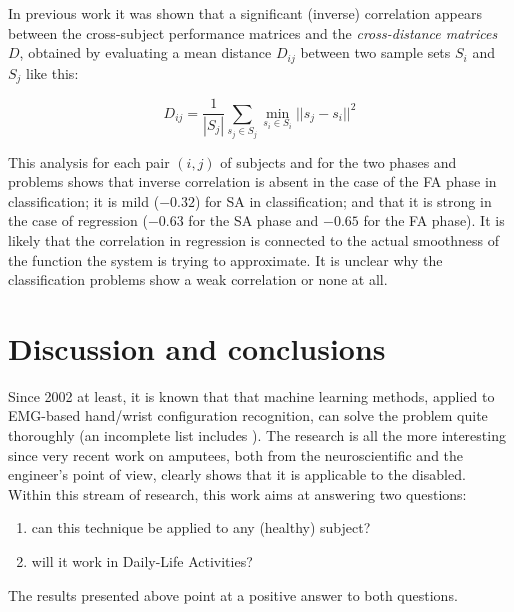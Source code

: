 \documentclass[10pt]{bmc_article}
\newenvironment{bmcformat}
  {\begin{raggedright}\baselineskip20pt\sloppy\setboolean{publ}{false}}
  {\end{raggedright}\baselineskip20pt\sloppy}
\begin{document}
\begin{bmcformat}
In previous work it was shown that a significant (inverse) correlation
appears between the cross-subject performance matrices and the
\emph{cross-distance matrices} $D$,
obtained by evaluating a mean distance $D_{ij}$ between
two sample sets $S_i$ and $S_j$ like this:

$$ D_{ij} = \frac{1}{|S_j|} \sum_{s_j \in S_j}{\min_{s_i \in S_i}{ ||s_j-s_i||^2 } } $$

This analysis for each pair $(i,j)$ of subjects and for
the two phases and problems shows that inverse correlation
is absent in the case of the FA phase in classification; it is mild
($-0.32$) for SA in classification; and that it is strong in the case
of regression ($-0.63$ for the SA phase and $-0.65$ for the FA
phase). It is likely that the correlation in regression is connected
to the actual smoothness of the function the system is trying to
approximate. It is unclear why the classification problems show a
weak correlation or none at all.

\section*{Discussion and conclusions}
\label{sec:discussion}

Since 2002 at least, it is known that that machine learning methods,
applied to EMG-based hand/wrist configuration recognition, can solve
the problem quite thoroughly (an incomplete list includes
\cite{chan2005,tsukamoto,englehart08,cipriani,2008.BioCyb}). The
research is all the more interesting since very recent work on
amputees, both from the neuroscientific \cite{sirigu1,sirigu2}
and the engineer's \cite{sebelius,2009.JPP,ramos}
point of view, clearly shows that it is applicable to the disabled.
Within this stream of research, this work aims at answering two questions:

\begin{enumerate}

  \item can this technique be applied to any (healthy) subject?

  \item will it work in Daily-Life Activities?

\end{enumerate}

The results presented above point at a positive answer to both questions.


\end{bmcformat}
\end{document}

